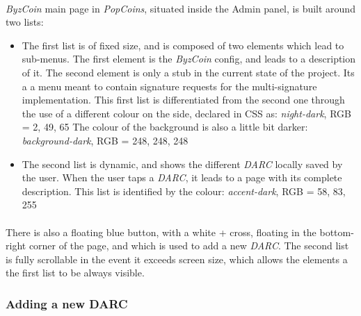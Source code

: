 \paragraph{}

\textit{ByzCoin} main page in \textit{PopCoins}, situated inside the Admin panel, is built around two lists:

\begin{itemize}
    \item The first list is of fixed size, and is composed of two elements which lead to sub-menus. The first element is the \textit{ByzCoin} config, and leads to a description of it. The second element is only a stub in the current state of the project. Its a a menu meant to contain signature requests for the multi-signature implementation. This first list is differentiated from the second one through the use of a different colour on the side, declared in CSS as:\newline
     \textit{night-dark}, RGB = {2, 49, 65}\newline
    The colour of the background is also a little bit darker:\newline
     \textit{background-dark}, RGB = {248, 248, 248}
    \item The second list is dynamic, and shows the different \textit{DARC} locally saved by the user. When the user taps a \textit{DARC}, it leads to a page with its complete description. This list is identified  by the colour:\newline
     \textit{accent-dark}, RGB = {58, 83, 255}
\end{itemize}

\paragraph{}

There is also a floating blue button, with a white + cross, floating in the bottom-right corner of the page, and which is used to add a new \textit{DARC}. The second list is fully scrollable in the event it exceeds screen size, which allows the elements a the first list to be always visible.

\subsubsection{Adding a new DARC}

\paragraph{}

